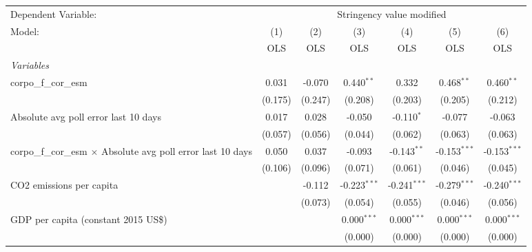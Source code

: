 
\begingroup
\centering
\begin{tabular}{lcccccc}
   \toprule
   Dependent Variable: & \multicolumn{6}{c}{Stringency value modified}\\
   Model:                                                               & (1)     & (2)     & (3)            & (4)            & (5)            & (6)\\  
                                                                        &  OLS    & OLS     & OLS            & OLS            & OLS            & OLS\\  
   \midrule
   \emph{Variables}\\
   corpo\_f\_cor\_esm                                                   & 0.031   & -0.070  & 0.440$^{**}$   & 0.332          & 0.468$^{**}$   & 0.460$^{**}$\\   
                                                                        & (0.175) & (0.247) & (0.208)        & (0.203)        & (0.205)        & (0.212)\\   
   Absolute avg poll error last 10 days                                 & 0.017   & 0.028   & -0.050         & -0.110$^{*}$   & -0.077         & -0.063\\   
                                                                        & (0.057) & (0.056) & (0.044)        & (0.062)        & (0.063)        & (0.063)\\   
   corpo\_f\_cor\_esm $\times$ Absolute avg poll error last 10 days     & 0.050   & 0.037   & -0.093         & -0.143$^{**}$  & -0.153$^{***}$ & -0.153$^{***}$\\   
                                                                        & (0.106) & (0.096) & (0.071)        & (0.061)        & (0.046)        & (0.045)\\   
   CO2 emissions per capita                                             &         & -0.112  & -0.223$^{***}$ & -0.241$^{***}$ & -0.279$^{***}$ & -0.240$^{***}$\\   
                                                                        &         & (0.073) & (0.054)        & (0.055)        & (0.046)        & (0.056)\\   
   GDP per capita (constant 2015 US\$)                                  &         &         & 0.000$^{***}$  & 0.000$^{***}$  & 0.000$^{***}$  & 0.000$^{***}$\\   
                                                                        &         &         & (0.000)        & (0.000)        & (0.000)        & (0.000)\\   

\end{tabular}
